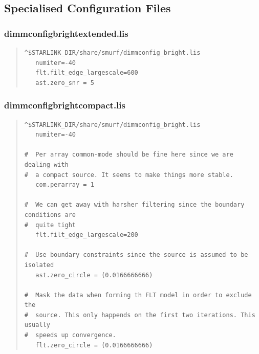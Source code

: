 \documentclass[twoside,11pt]{article}
\newcommand{\xlabel}[1]{}
\renewcommand{\_}{\texttt{\symbol{95}}}
\newenvironment{myquote}{\begin{quote}\begin{small}}{\end{small}\end{quote}}
\begin{document}
\newpage
\subsection{\xlabel{special}Specialised Configuration Files}
\label{app:special}

\subsubsection{dimmconfig\_bright\_extended.lis}
\begin{myquote}
\begin{verbatim}
^$STARLINK_DIR/share/smurf/dimmconfig_bright.lis
   numiter=-40
   flt.filt_edge_largescale=600
   ast.zero_snr = 5

\end{verbatim}
\end{myquote}

\subsubsection{dimmconfig\_bright\_compact.lis}
\begin{myquote}
\begin{verbatim}
^$STARLINK_DIR/share/smurf/dimmconfig_bright.lis
   numiter=-40

#  Per array common-mode should be fine here since we are dealing with
#  a compact source. It seems to make things more stable.
   com.perarray = 1

#  We can get away with harsher filtering since the boundary conditions are
#  quite tight
   flt.filt_edge_largescale=200

#  Use boundary constraints since the source is assumed to be isolated
   ast.zero_circle = (0.0166666666)

#  Mask the data when forming th FLT model in order to exclude the
#  source. This only happends on the first two iterations. This usually
#  speeds up convergence.
   flt.zero_circle = (0.0166666666)

\end{verbatim}
\end{myquote}
\end{document}
